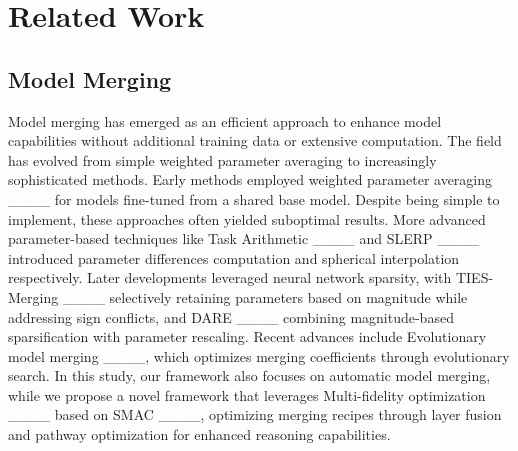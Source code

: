 \section{Related Work}
\subsection{Model Merging}
Model merging has emerged as an efficient approach to enhance model capabilities without additional training data or extensive computation. The field has evolved from simple weighted parameter averaging to increasingly sophisticated methods. Early methods employed weighted parameter averaging  ____ for models fine-tuned from a shared base model. Despite being simple to implement, these approaches often yielded suboptimal results. More advanced parameter-based techniques like Task Arithmetic ____ and SLERP ____ introduced parameter differences computation and spherical interpolation respectively. Later developments leveraged neural network sparsity, with TIES-Merging ____ selectively retaining parameters based on magnitude while addressing sign conflicts, and DARE ____ combining magnitude-based sparsification with parameter rescaling. Recent advances include Evolutionary model merging ____, which optimizes merging coefficients through evolutionary search. In this study, our framework also focuses on automatic model merging, while we propose a novel framework that leverages Multi-fidelity optimization ____ based on SMAC ____, optimizing merging recipes through layer fusion and pathway optimization for enhanced reasoning capabilities.






